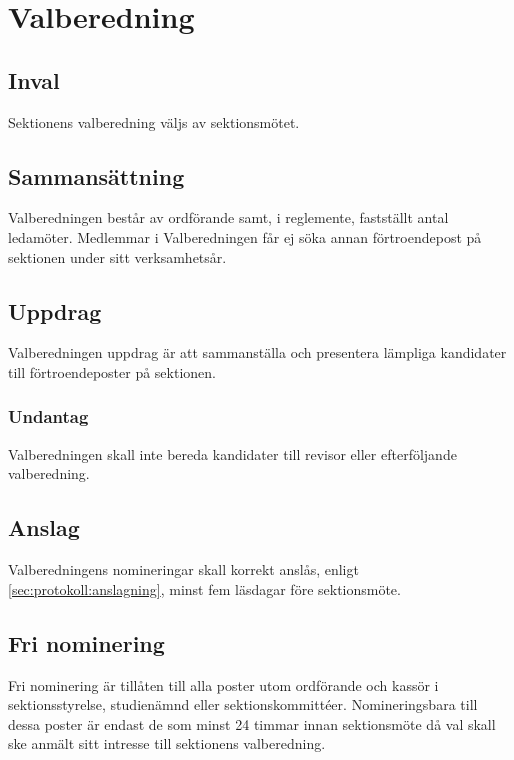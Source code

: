 \section{Valberedning}

\subsection{Inval}

Sektionens valberedning väljs av sektionsmötet.

\subsection{Sammansättning}

Valberedningen består av ordförande samt, i reglemente, fastställt antal ledamöter. Medlemmar i Valberedningen får ej söka annan förtroendepost på sektionen under sitt verksamhetsår.

\subsection{Uppdrag}

Valberedningen uppdrag är att sammanställa och presentera lämpliga kandidater till förtroendeposter på sektionen.

\subsubsection{Undantag}
Valberedningen skall inte bereda kandidater till revisor eller efterföljande valberedning.

\subsection{Anslag}

Valberedningens nomineringar skall korrekt anslås, enligt \ref{sec:protokoll:anslagning}, minst fem läsdagar före sektionsmöte.

\subsection{Fri nominering}

Fri nominering är tillåten till alla poster utom ordförande och kassör i sektionsstyrelse, studienämnd eller sektionskommittéer. Nomineringsbara till dessa poster är endast de som minst 24 timmar innan sektionsmöte då val skall ske anmält sitt intresse till sektionens valberedning.

